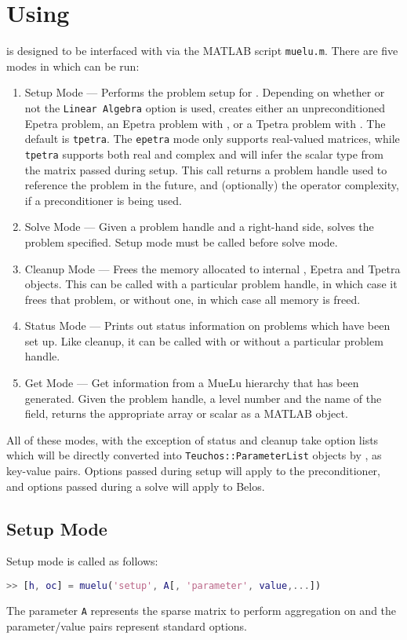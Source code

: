 \section{Using \muemex}\label{sec:muemex:usage}
\muemex is designed to be interfaced with via the MATLAB script
\texttt{muelu.m}.  There are five modes in which \muemex can be run:
\begin{enumerate}
\item Setup Mode --- Performs the problem setup for \muelu.
  Depending on whether or not the \texttt{Linear Algebra} option is
  used, \muemex creates either an unpreconditioned Epetra problem,
  an Epetra problem with \muelu, or a Tpetra problem with \muelu.
  The default is \texttt{tpetra}. The \texttt{epetra} mode only supports
  real-valued matrices, while \texttt{tpetra} 
  supports both real and complex and will infer the scalar type
  from the matrix passed during setup.  This call returns a problem
  handle used to reference the problem in the future, and (optionally)
  the operator complexity, if a preconditioner is being used.
\item Solve Mode --- Given a problem handle and a right-hand side, \muemex
  solves the problem specified.  Setup mode must be called before
  solve mode.
\item Cleanup Mode --- Frees the memory allocated to internal \muelu,
  Epetra and Tpetra objects.  This can be called with a particular
  problem handle, in which case it frees that problem, or without one,
  in which case all \muemex memory is freed.
\item Status Mode --- Prints out status information on problems which
  have been set up.  Like cleanup, it can be called with or without a
  particular problem handle.
\item Get Mode --- Get information from a MueLu hierarchy that has been
  generated. Given the problem handle, a level number and the name of the
  field, returns the appropriate array or scalar as a MATLAB object.
\end{enumerate}
All of these modes, with the exception of status and cleanup take
option lists which will be directly converted into
\texttt{Teuchos::ParameterList} objects by \muemex, as key-value pairs.
Options passed during setup will apply to the \muelu preconditioner, and
options passed during a solve will apply to Belos.

\subsection{Setup Mode}
Setup mode is called as follows:
\begin{lstlisting}[language=Matlab]
  >> [h, oc] = muelu('setup', A[, 'parameter', value,...])
\end{lstlisting}
The parameter \texttt{A} represents the sparse matrix to perform aggregation on
and the parameter/value pairs represent standard \muelu options.

